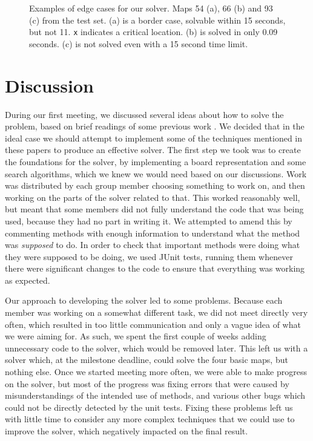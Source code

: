 \documentclass[a4paper,11pt]{article}
\begin{document}
\begin{figure}
  \centering
  \subfloat[Unsolved]{\usebox{\mapnt}}
  \caption{Examples of edge cases for our solver. Maps 54 (a), 66 (b) and 93 (c)
    from the test set. (a) is a border case, solvable within 15 seconds, but not
    11. \texttt{x} indicates a critical location. (b) is solved in only 0.09
    seconds. (c) is not solved even with a 15 second time limit.}
  \label{fig:edgemap}
\end{figure}

\section{Discussion}
During our first meeting, we discussed several ideas about how to solve the
problem, based on brief readings of some previous work \cite{virkkala, jung}. We
decided that in the ideal case we should attempt to implement some of the
techniques mentioned in these papers to produce an effective solver. The first
step we took was to create the foundations for the solver, by implementing a
board representation and some search algorithms, which we knew we would need
based on our discussions. Work was distributed by each group member choosing
something to work on, and then working on the parts of the solver related to
that. This worked reasonably well, but meant that some members did not fully
understand the code that was being used, because they had no part in writing
it. We attempted to amend this by commenting methods with enough information to
understand what the method was \emph{supposed} to do. In order to check that
important methods were doing what they were supposed to be doing, we used JUnit
tests, running them whenever there were significant changes to the code to
ensure that everything was working as expected.

Our approach to developing the solver led to some problems. Because each member
was working on a somewhat different task, we did not meet directly very often,
which resulted in too little communication and only a vague idea of what we were
aiming for. As such, we spent the first couple of weeks adding unnecessary code
to the solver, which would be removed later. This left us with a solver which,
at the milestone deadline, could solve the four basic maps, but nothing
else. Once we started meeting more often, we were able to make progress on the
solver, but most of the progress was fixing errors that were caused by
misunderstandings of the intended use of methods, and various other bugs which
could not be directly detected by the unit tests. Fixing these problems left us
with little time to consider any more complex techniques that we could use to
improve the solver, which negatively impacted on the final result.
\end{document}
